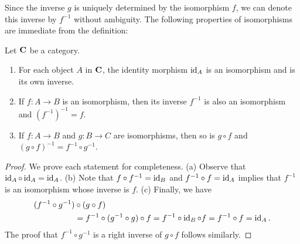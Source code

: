Since the inverse \(g\) is uniquely determined by the isomorphism \(f\), we can
denote this inverse by \(f^{-1}\) without ambiguity. The following properties of
isomorphisms are immediate from the definition:

\begin{theorem}
    \label{thm:isomorphism-properties-cat}
    Let \(\mathbf{C}\) be a category.
    \begin{enumerate}[label=(\alph*), itemsep=0pt]
        \item For each object \(A\) in \(\mathbf{C}\), the identity morphism
        \(\operatorname{id}_A\) is an isomorphism and is its own inverse.
        \item If \(f: A \to B\) is an isomorphism, then its inverse \(f^{-1}\)
        is also an isomorphism and \((f^{-1})^{-1} = f\).
        \item If \(f : A \to B\) and \(g : B \to C\) are isomorphisms, then so
        is \(g \circ f\) and \((g \circ f)^{-1} = f^{-1} \circ g^{-1}\).
    \end{enumerate}
\end{theorem}

\begin{proof}
    We prove each statement for completeness. (a) Observe that \(\operatorname{id}_A \circ
    \operatorname{id}_A = \operatorname{id}_A\). (b) Note that \(f \circ f^{-1} = \operatorname{id}_B\) and \(f^{-1} \circ
    f = \operatorname{id}_A\) implies that \(f^{-1}\) is an isomorphism whose inverse is
    \(f\). (c) Finally, we have
    \begin{align*}
        (f^{-1} \circ g^{-1}) &\circ (g \circ f)\\
        &= f^{-1} \circ (g^{-1} \circ g) \circ f = f^{-1} \circ \operatorname{id}_B \circ f = f^{-1} \circ f = \operatorname{id}_A.
    \end{align*}
    The proof that \(f^{-1} \circ g^{-1}\) is a right inverse of \(g \circ f\)
    follows similarly.
\end{proof}

